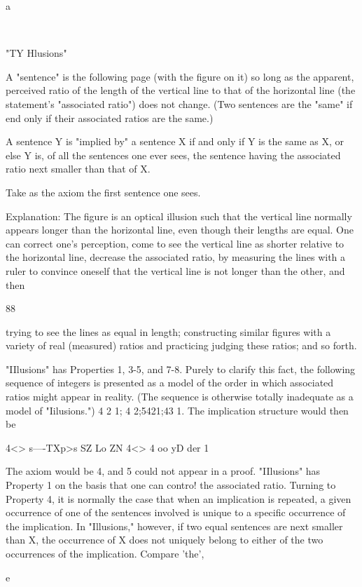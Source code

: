 \documentclass[10pt,twoside]{memoir}
\begin{document}
\begin{enumerate}
{{{{{{{{{{{{{{{{a 


~ 


"TY Hlusions" 


A "sentence" is the following page (with the figure on it) so long as the 
apparent, perceived ratio of the length of the vertical line to that 
of the horizontal line (the statement's "associated ratio") does not 
change. (Two sentences are the "same" if end only if their 
associated ratios are the same.) 

A sentence Y is "implied by" a sentence X if and only if Y is the same as X, 
or else Y is, of all the sentences one ever sees, the sentence having 
the associated ratio next smaller than that of X. 

Take as the axiom the first sentence one sees. 

Explanation: The figure is an optical illusion such that the vertical line 
normally appears longer than the horizontal line, even though their 
lengths are equal. One can correct one's perception, come to see 
the vertical line as shorter relative to the horizontal line, decrease 
the associated ratio, by measuring the lines with a ruler to convince 
oneself that the vertical line is not longer than the other, and then 


88 


trying to see the lines as equal in length; constructing similar 
figures with a variety of real (measured) ratios and practicing 
judging these ratios; and so forth. 


"IIlusions" has Properties 1, 3-5, and 7-8. Purely to clarify this fact, the 
following sequence of integers is presented as a model of the order in which 
associated ratios might appear in reality. (The sequence is otherwise totally 
inadequate as a model of "Iilusions.") 4 2 1; 4 2;5421;43 1. The 
implication structure would then be 


4<> 
s—-TXp>s SZ Lo ZN 
4<> 4 oo yD der 1 


The axiom would be 4, and 5 could not appear in a proof. "IIlusions" has 
Property 1 on the basis that one can contro! the associated ratio. Turning to 
Property 4, it is normally the case that when an implication is repeated, a 
given occurrence of one of the sentences involved is unique to a specific 
occurrence of the implication. In "Illusions," however, if two equal 
sentences are next smaller than X, the occurrence of X does not uniquely 
belong to either of the two occurrences of the implication. Compare 'the', 


e 


}}}}}}}}}}}}}}}}
\end{enumerate}
\end{document}
